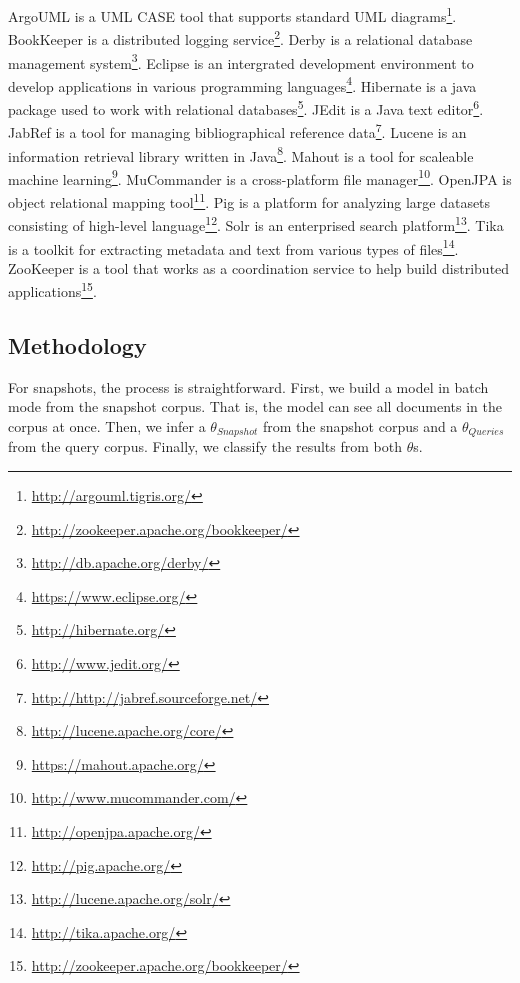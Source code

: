 ArgoUML is a UML CASE tool that supports standard UML diagrams\footnote{\url{http://argouml.tigris.org/}}.
BookKeeper is a distributed logging service\footnote{\url{http://zookeeper.apache.org/bookkeeper/}}.
Derby is a relational database management system\footnote{\url{http://db.apache.org/derby/}}.
Eclipse is an intergrated development environment to develop applications in various programming languages\footnote{\url{https://www.eclipse.org/}}.
Hibernate is a java package used to work with relational databases\footnote{\url{http://hibernate.org/}}.
JEdit is a Java text editor\footnote{\url{http://www.jedit.org/}}.
JabRef is a tool for managing bibliographical reference data\footnote{\url{http://http://jabref.sourceforge.net/}}.
Lucene is an information retrieval library written in Java\footnote{\url{http://lucene.apache.org/core/}}.
Mahout is a tool for scaleable machine learning\footnote{\url{https://mahout.apache.org/}}.
MuCommander is a cross-platform file manager\footnote{\url{http://www.mucommander.com/}}.
OpenJPA is object relational mapping tool\footnote{\url{http://openjpa.apache.org/}}.
Pig is a platform for analyzing large datasets consisting of high-level language\footnote{\url{http://pig.apache.org/}}.
Solr is an enterprised search platform\footnote{\url{http://lucene.apache.org/solr/}}.
Tika is a toolkit for extracting metadata and text from various types of files\footnote{\url{http://tika.apache.org/}}.
ZooKeeper is a tool that works as a coordination service to help build distributed applications\footnote{\url{http://zookeeper.apache.org/bookkeeper/}}.



\subsection{Methodology}
\label{sec:methodology}

For snapshots, the process is straightforward.
First, we build a model in batch mode from the snapshot corpus.
That is, the model can see all documents in the corpus at once.
Then, we infer a $\theta_{Snapshot}$ from the snapshot corpus
and a $\theta_{Queries}$ from the query corpus.
Finally, we classify the results from both $\theta$s.

\begin{comment}
\begin{enumerate}
    \item Build model from the snapshot corpus in batch mode
    \item Infer a $\theta_{Snapshot}$ from the snapshot corpus
    \item Infer a $\theta_{Queries}$ from the query corpus
    \item Classify, or rank, the results from both $\theta$s
\end{enumerate}
\end{comment}


